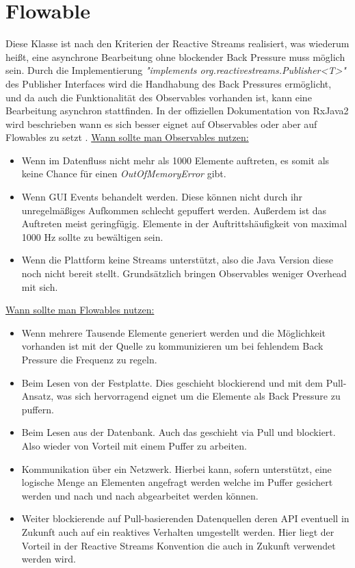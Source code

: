 \section{Flowable}
Diese Klasse ist nach den Kriterien der Reactive Streams realisiert, was wiederum heißt, eine asynchrone Bearbeitung ohne blockender Back Pressure muss möglich sein. Durch die Implementierung \textit{"implements org.reactivestreams.Publisher<T>"} des Publisher Interfaces wird die Handhabung des Back Pressures ermöglicht, und da auch die Funktionalität des Observables vorhanden ist, kann eine Bearbeitung asynchron stattfinden. In der offiziellen Dokumentation von RxJava2 wird beschrieben wann es sich besser eignet auf Observables oder aber auf Flowables zu setzt \cite{rxdifference}. \underline{Wann sollte man Observables nutzen:}
\begin{itemize}
	\item Wenn im Datenfluss nicht mehr als 1000 Elemente auftreten, es somit als keine Chance für einen \textit{OutOfMemoryError} gibt.
	\item Wenn GUI Events behandelt werden. Diese können nicht durch ihr unregelmäßiges Aufkommen schlecht gepuffert werden. Außerdem ist das Auftreten meist geringfügig. Elemente in der Auftrittshäufigkeit von maximal 1000 Hz sollte zu bewältigen sein.
	\item Wenn die Plattform keine Streams unterstützt, also die Java Version diese noch nicht bereit stellt. Grundsätzlich bringen Observables weniger Overhead mit sich.
\end{itemize}
\underline{Wann sollte man Flowables nutzen:}
\begin{itemize}
	\item Wenn mehrere Tausende Elemente generiert werden und die Möglichkeit vorhanden ist mit der Quelle zu kommunizieren um bei fehlendem Back Pressure die Frequenz zu regeln.
	\item Beim Lesen von der Festplatte. Dies geschieht blockierend und mit dem Pull-Ansatz, was sich hervorragend eignet um die Elemente als Back Pressure zu puffern.
	\item Beim Lesen aus der Datenbank. Auch das geschieht via Pull und blockiert. Also wieder von Vorteil mit einem Puffer zu arbeiten.
	\item Kommunikation über ein Netzwerk. Hierbei kann, sofern unterstützt, eine logische Menge an Elementen angefragt werden welche im Puffer gesichert werden und nach und nach abgearbeitet werden können.
	\item Weiter blockierende auf Pull-basierenden Datenquellen deren API eventuell in Zukunft auch auf ein reaktives Verhalten umgestellt werden. Hier liegt der Vorteil in der Reactive Streams Konvention die auch in Zukunft verwendet werden wird.
\end{itemize}
